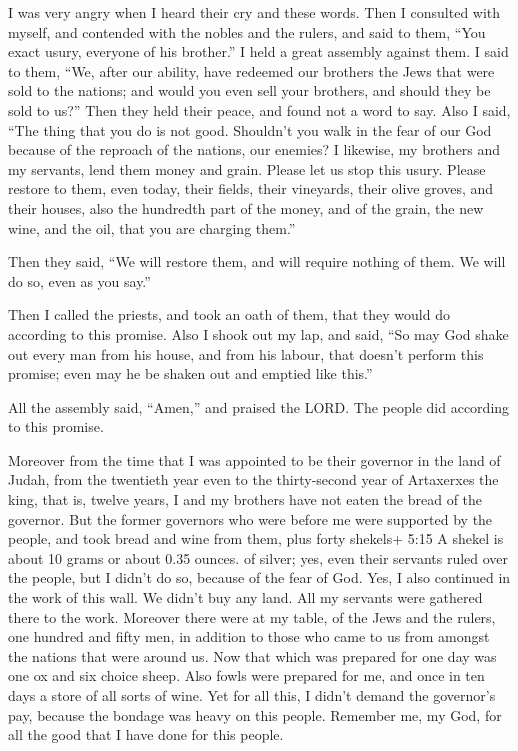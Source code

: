  I was very angry when I heard their cry and these words.
 Then I consulted with myself, and contended with the nobles
and the rulers, and said to them, ``You exact usury, everyone of his
brother.'' I held a great assembly against them.  I said to
them, ``We, after our ability, have redeemed our brothers the Jews that
were sold to the nations; and would you even sell your brothers, and
should they be sold to us?'' Then they held their peace, and found not a
word to say.  Also I said, ``The thing that you do is not
good. Shouldn't you walk in the fear of our God because of the reproach
of the nations, our enemies?  I likewise, my brothers and
my servants, lend them money and grain. Please let us stop this usury.
 Please restore to them, even today, their fields, their
vineyards, their olive groves, and their houses, also the hundredth part
of the money, and of the grain, the new wine, and the oil, that you are
charging them.''

 Then they said, ``We will restore them, and will require
nothing of them. We will do so, even as you say.''

Then I called the priests, and took an oath of them, that they would do
according to this promise.  Also I shook out my lap, and
said, ``So may God shake out every man from his house, and from his
labour, that doesn't perform this promise; even may he be shaken out and
emptied like this.''

All the assembly said, ``Amen,'' and praised the LORD. The people did
according to this promise.

 Moreover from the time that I was appointed to be their
governor in the land of Judah, from the twentieth year even to the
thirty-second year of Artaxerxes the king, that is, twelve years, I and
my brothers have not eaten the bread of the governor.  But
the former governors who were before me were supported by the people,
and took bread and wine from them, plus forty shekels+ 5:15 A shekel is
about 10 grams or about 0.35 ounces. of silver; yes, even their servants
ruled over the people, but I didn't do so, because of the fear of God.
 Yes, I also continued in the work of this wall. We didn't
buy any land. All my servants were gathered there to the work.
 Moreover there were at my table, of the Jews and the
rulers, one hundred and fifty men, in addition to those who came to us
from amongst the nations that were around us.  Now that
which was prepared for one day was one ox and six choice sheep. Also
fowls were prepared for me, and once in ten days a store of all sorts of
wine. Yet for all this, I didn't demand the governor's pay, because the
bondage was heavy on this people.  Remember me, my God, for
all the good that I have done for this people.

